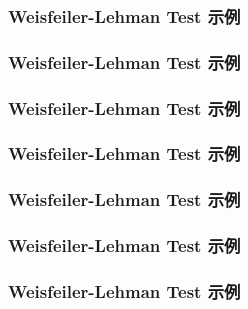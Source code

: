 \documentclass{beamer}
\begin{document}
\begin{frame}

  \frametitle{Weisfeiler-Lehman Test 示例}

\end{frame}

\begin{frame}

  \frametitle{Weisfeiler-Lehman Test 示例}

\end{frame}

\begin{frame}

  \frametitle{Weisfeiler-Lehman Test 示例}

\end{frame}

\begin{frame}

  \frametitle{Weisfeiler-Lehman Test 示例}

\end{frame}

\begin{frame}

  \frametitle{Weisfeiler-Lehman Test 示例}

\end{frame}

\begin{frame}

  \frametitle{Weisfeiler-Lehman Test 示例}

\end{frame}

\begin{frame}

  \frametitle{Weisfeiler-Lehman Test 示例}

\end{frame}
\end{document}
